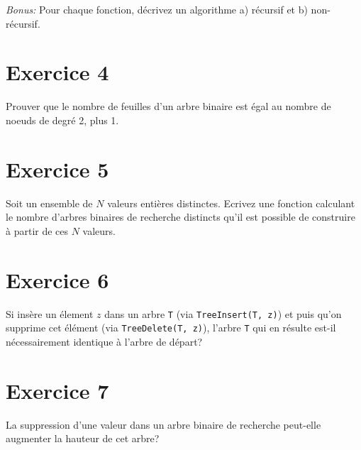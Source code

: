 \documentclass[a4paper,10pt]{article}
\begin{document}
\textit{Bonus:} Pour chaque fonction, décrivez un algorithme a) récursif et b) non-récursif.

\section*{Exercice 4}

Prouver que le nombre de feuilles d'un arbre binaire est égal au nombre de noeuds de degré 2, plus 1.

\section*{Exercice 5}

Soit un ensemble de $N$ valeurs entières distinctes. Ecrivez une fonction calculant le nombre d'arbres binaires de recherche distincts qu'il est possible de construire à partir de ces $N$ valeurs.

\section*{Exercice 6}

Si insère un élement $z$ dans un arbre \texttt{T} (via \texttt{TreeInsert(T, z)}) et puis qu'on supprime cet élément (via \texttt{TreeDelete(T, z)}), l'arbre \texttt{T} qui en résulte est-il nécessairement identique à l'arbre de départ?

\section*{Exercice 7}

La suppression d'une valeur dans un arbre binaire de recherche peut-elle augmenter la hauteur de cet arbre?
\end{document}
